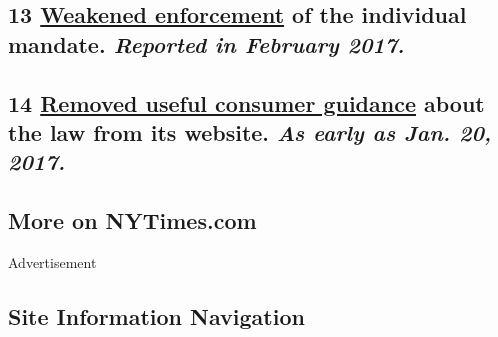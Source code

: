 \hypertarget{13-weakened-enforcement-of-the-individual-mandate-reported-in-february-2017}{%
\subsection{\texorpdfstring{\textbf{13}
\href{https://www.nytimes3xbfgragh.onion/2017/02/15/us/politics/affordable-care-act-obamacare-trump.html}{Weakened
enforcement} of the individual mandate. \emph{Reported in February
2017.}}{13 Weakened enforcement of the individual mandate. Reported in February 2017.}}\label{13-weakened-enforcement-of-the-individual-mandate-reported-in-february-2017}}

\hypertarget{14-removed-useful-consumer-guidance-about-the-law-from-its-website-as-early-as-jan-20-2017}{%
\subsection{\texorpdfstring{\textbf{14}
\href{https://www.nytimes3xbfgragh.onion/interactive/2017/09/04/us/hhs-anti-obamacare-campaign.html?mcubz=0}{Removed
useful consumer guidance} about the law from its website. \emph{As early
as Jan. 20,
2017.}}{14 Removed useful consumer guidance about the law from its website. As early as Jan. 20, 2017.}}\label{14-removed-useful-consumer-guidance-about-the-law-from-its-website-as-early-as-jan-20-2017}}

\hypertarget{more-on-nytimescom}{%
\subsection{More on NYTimes.com}\label{more-on-nytimescom}}

Advertisement

\hypertarget{site-information-navigation}{%
\subsection{Site Information
Navigation}\label{site-information-navigation}}

